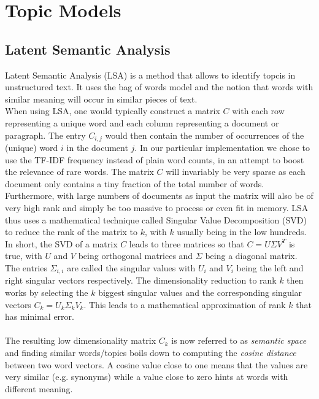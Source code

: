 \section{Topic Models}
\subsection{Latent Semantic Analysis}

Latent Semantic Analysis (LSA) is a method that allows to identify topcis in unstructured text. It uses the bag of words model and the notion that words with similar meaning will occur in similar pieces of text. \\
When using LSA, one would typically construct a matrix $C$  with each row representing a unique word and each column representing a document or paragraph. The entry $C_{i,j}$ would then contain the number of occurrences of the (unique) word $i$ in the document $j$. In our particular implementation we chose to use the TF-IDF frequency instead of plain word counts, in an attempt to boost the relevance of rare words. The matrix $C$ will invariably be very sparse as each document only contains a tiny fraction of the total number of words. Furthermore, with large numbers of documents as input the matrix will also be of very high rank and simply be too massive to process or even fit in memory. LSA thus uses a mathematical technique called Singular Value Decomposition (SVD) to reduce the rank of the matrix to $k$, with $k$ usually being in the low hundreds. In short, the SVD of a matrix $C$ leads to three matrices so that $C = U{\Sigma}V^T$ is true, with $U$ and $V$ being orthogonal matrices and $\Sigma$ being a diagonal matrix. The entries $\Sigma_{i,i}$ are called the singular values with $U_{i}$ and $V_{i}$ being the left and right singular vectors respectively. The dimensionality reduction to rank $k$ then works by selecting the $k$ biggest singular values and the corresponding singular vectors $C_{k} = U_{k}{\Sigma_{k}}V_{k}$. This leads to a mathematical approximation of rank $k$ that has minimal error.\\\\

The resulting low dimensionality matrix $C_{k}$ is now referred to as \emph{semantic space} and finding similar words/topics boils down to computing the \emph{cosine distance} between two word vectors. A cosine value close to one means that the values are very similar (e.g. synonyms) while a value close to zero hints at words with different meaning.
